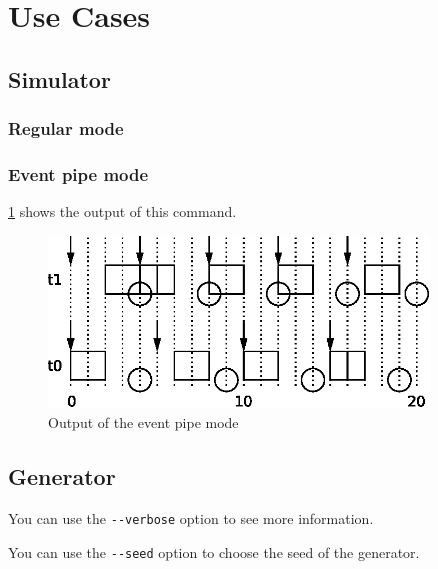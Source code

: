 \documentclass[a4paper,12pt]{article}
\begin{document}
\newpage\cleardoublepage{}
\section{Use Cases}
\label{sec:use}
\subsection{Simulator}


\subsubsection{Regular mode}




\subsubsection{Event pipe mode}


\ref{fig:use:1} shows the output of this command.

\begin{figure}
	\centering
	\includegraphics[width=0.9\textwidth]{../schedule/eps/1.eps}
	\caption{Output of the event pipe mode}
	\label{fig:use:1}
\end{figure}

\subsection{Generator}


You can use the \verb#--verbose# option to see more information.

You can use the \verb#--seed# option to choose the seed of the generator.
\end{document}
